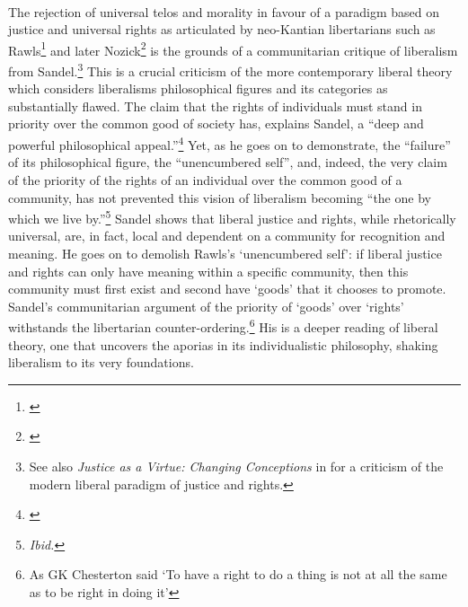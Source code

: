 \documentclass[12pt,a4paper,titlepage]{article}
\begin{document}
\paragraph{}The rejection of universal telos and morality in favour of a paradigm based on justice and universal rights as articulated by neo-Kantian libertarians such as Rawls\footnote{\cite{rawls:1972tj}} and later Nozick\footnote{\cite{Nozick:1974lr}} is the grounds of a communitarian critique of liberalism from Sandel.\footnote{See also \textit{Justice as a Virtue: Changing Conceptions} in \cite[pp. 244-255]{MacIntyre:1981lr} for a criticism of the modern liberal paradigm of justice and rights.} This is a crucial criticism of the more contemporary liberal theory which considers liberalisms philosophical figures and its categories as substantially flawed. The claim that the rights of individuals must stand in priority over the common good of society has, explains Sandel, a ``deep and powerful philosophical appeal.''\footnote{\cite[p. 82]{sandel:1984pr}} Yet, as he goes on to demonstrate, the ``failure'' of its philosophical figure, the ``unencumbered self'', and, indeed, the very claim of the priority of the rights of an individual over the common good of a community, has not prevented this vision of liberalism becoming ``the one by which we live by.''\footnote{\textit{Ibid.}} Sandel shows that liberal justice and rights, while rhetorically universal, are, in fact, local and dependent on a community for recognition and meaning. He goes on to demolish Rawls's `unencumbered self': if liberal justice and rights can only have meaning within a specific community, then this community must first exist and second have `goods' that it chooses to promote. Sandel's communitarian argument of the priority of `goods' over `rights' withstands the libertarian counter-ordering.\footnote{As GK Chesterton said `To have a right to do a thing is not at all the same as to be right in doing it'} His is a deeper reading of liberal theory, one that uncovers the aporias in its individualistic philosophy, shaking liberalism to its very foundations.
\end{document}

